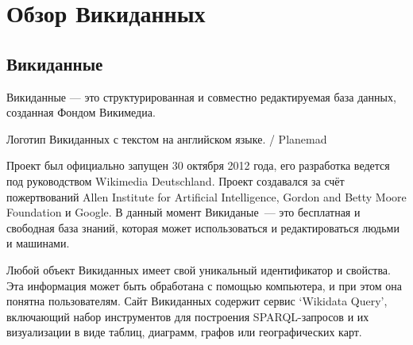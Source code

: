 \chapter{Обзор Викиданных}
\label{ch:ReviewAboutWD}

\section{Викиданные}
Викиданные — это структурированная и совместно редактируемая база данных, созданная Фондом Викимедиа\footnotemark {}. \begin{marginfigure}[0.0cm]
{
	\setlength{\fboxsep}{0pt}%
	\setlength{\fboxrule}{1pt}%
}
\caption
{
Логотип Викиданных с текстом на английском языке.  / Planemad
}
\label{fig:seyu}
\end{marginfigure}Проект был официально запущен 30 октября 2012 года, его разработка ведется под руководством Wikimedia Deutschland\cite{Wikipedia_review}. Проект создавался за счёт пожертвований Allen Institute for Artificial Intelligence, Gordon and Betty Moore Foundation и Google. В данный момент Викиданые — это бесплатная и свободная база знаний, которая может использоваться и редактироваться людьми и машинами\cite{Vrandecic}.

Любой объект Викиданных имеет свой уникальный идентификатор и свойства. Эта информация может быть обработана с помощью компьютера, и при этом она понятна пользователям. Сайт Викиданных содержит сервис ‘Wikidata Query’, включающий набор инструментов для построения SPARQL-запросов и их визуализации в виде таблиц, диаграмм, графов или географических карт.

